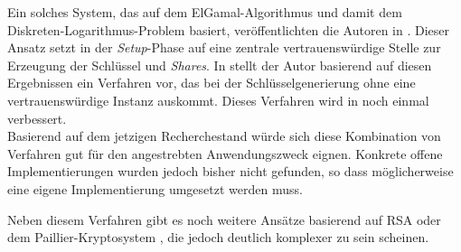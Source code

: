\documentclass[
    fontsize=12pt,
    headings=small,
    parskip=half,           %
    bibliography=totoc,
    numbers=noenddot,       %
    open=any,               %
   final                   %
    ]{scrreprt}
\begin{document}
Ein solches System, das auf dem ElGamal-Algorithmus und damit dem Diskreten-Logarithmus-Problem basiert, veröffentlichten die Autoren in \cite{DesmedtFrankel1990}.  Dieser Ansatz setzt in der \textit{Setup}-Phase auf eine zentrale vertrauenswürdige Stelle zur Erzeugung der Schlüssel und \textit{Shares}. In \cite{pedersen1991} stellt der Autor basierend auf diesen Ergebnissen ein Verfahren vor, das bei der Schlüsselgenerierung ohne eine vertrauenswürdige Instanz auskommt. Dieses Verfahren wird in \cite{gennaro1999} noch einmal verbessert.\\
Basierend auf dem jetzigen Recherchestand würde sich diese Kombination von Verfahren gut für den angestrebten Anwendungszweck eignen. Konkrete offene Implementierungen wurden jedoch bisher nicht gefunden, so dass möglicherweise eine eigene Implementierung umgesetzt werden muss.

Neben diesem Verfahren gibt es noch weitere Ansätze basierend auf RSA \cite{desmedt1993, nguyen2005} oder dem Paillier-Kryptosystem \cite{paillier1999, damgard2001}, die jedoch deutlich komplexer zu sein scheinen. 



\begin{raggedright}         %
  \printbibliography        %
  \label{sec:literaturverzeichnis}
\end{raggedright}
\end{document}
